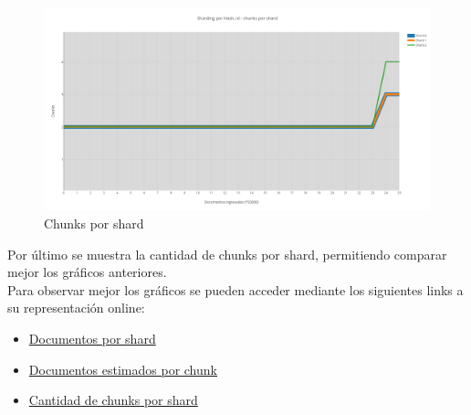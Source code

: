 \begin{figure}[h!]
 \centering
 \includegraphics[scale=0.3]{./hash-cantidad-de-chunks-por-shard.png}
 \caption{Chunks por shard}
\end{figure}

Por último se muestra la cantidad de chunks por shard, permitiendo comparar mejor los gráficos anteriores.\\

Para observar mejor los gráficos se pueden acceder mediante los siguientes links a su representación online:
\begin{itemize}
 \item \href{https://plot.ly/~fzanollo/46/sharding-por-hash-id-documentos-por-shard/}{Documentos por shard}
 \item \href{https://plot.ly/~fzanollo/45/sharding-por-hash-id-documentos-estimados-por-chunk/}{Documentos estimados por chunk}
 \item \href{https://plot.ly/~fzanollo/44/sharding-por-hash-id-chunks-por-shard/}{Cantidad de chunks por shard}
\end{itemize}


